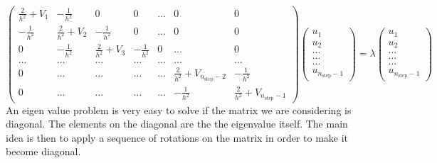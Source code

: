 \documentclass[10pt,a4paper,titlepage]{article}
\begin{document}
\[
    \left( \begin{array}{ccccccc} \frac{2}{h^2}+V_1 & -\frac{1}{h^2} & 0   & 0    & \dots  &0     & 0 \\
                                -\frac{1}{h^2} & \frac{2}{h^2}+V_2 & -\frac{1}{h^2} & 0    & \dots  &0     &0 \\
                                0   & -\frac{1}{h^2} & \frac{2}{h^2}+V_3 & -\frac{1}{h^2}  &0       &\dots & 0\\
                                \dots  & \dots & \dots & \dots  &\dots      &\dots & \dots\\
                                0   & \dots & \dots & \dots  &\dots       &\frac{2}{h^2}+V_{n_{\mathrm{step}}-2} & -\frac{1}{h^2}\\
                                0   & \dots & \dots & \dots  &\dots       &-\frac{1}{h^2} & \frac{2}{h^2}+V_{n_{\mathrm{step}}-1}

             \end{array} \right)  
                \left( \begin{array}{c} u_{1} \\
                                                              u_{2} \\
                                                              \dots\\ \dots\\ \dots\\
                                                              u_{n_{\mathrm{step}}-1}
             \end{array} \right)=\lambda \left( \begin{array}{c} u_{1} \\
                                                              u_{2} \\
                                                              \dots\\ \dots\\ \dots\\
                                                              u_{n_{\mathrm{step}}-1}
             \end{array} \right) 
\]
An eigen value problem is very easy to solve if the matrix we are considering is diagonal. The elements on the diagonal are the the eigenvalue itself. The
main idea is then to apply a sequence of rotations on the matrix in order to make it become diagonal. 
\end{document}
